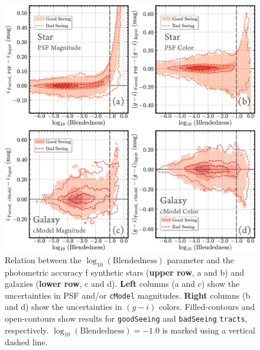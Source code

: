 \documentclass[useamsfonts]{pasj01}
\def\cmodel{\texttt{cModel}}
\def\tracts{\texttt{tracts}}
\begin{document}
\begin{figure}
    \begin{center}
        \includegraphics[width=\textwidth]{fig/synpipe_blendedness_err}
    \end{center}
    \caption{
        Relation between the $\log_{10} (\mathrm{Blendedness})$ parameter
        and the photometric accuracy f synthetic stars (\textbf{upper row}, a and 
        b) and galaxies (\textbf{lower row}, c and d).
        \textbf{Left} columns (a and c) show the uncertainties in PSF and/or \cmodel{} 
        magnitudes. \textbf{Right} columns (b and d) show the uncertainties in 
        $(g-i)$ colors.
        Filled-contours and open-contours show results for \texttt{goodSeeing} and
        \texttt{badSeeing} \tracts{}, respectively.
        $\log_{10} (\mathrm{Blendedness}) = -1.0$ is marked using a vertical dashed 
        line.
        }
    \label{fig:blend}
\end{figure}
\end{document}
